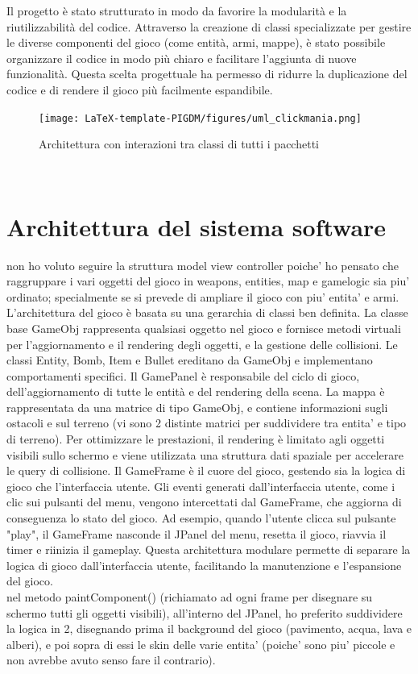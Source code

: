 \documentclass[12pt,a4paper]{report}
\begin{document}
Il progetto è stato strutturato in modo da favorire la modularità e la riutilizzabilità del codice.
Attraverso la creazione di classi specializzate per gestire le diverse componenti del gioco (come entità, armi, mappe),
è stato possibile organizzare il codice in modo più chiaro e facilitare l'aggiunta di nuove funzionalità.
Questa scelta progettuale ha permesso di ridurre la duplicazione del codice e di rendere il gioco più facilmente espandibile.
\begin{figure}[h]
    \centering
    \texttt{[image: LaTeX-template-PIGDM/figures/uml\_clickmania.png]}
    \caption{Architettura con interazioni tra classi di tutti i pacchetti}
    \label{fig:enter-label}
\end{figure}
\\

\section{Architettura del sistema software}\label{se:appjgal}


non ho voluto seguire la struttura model view controller poiche' ho pensato che raggruppare i vari oggetti del gioco in weapons,
entities, map e gamelogic sia piu' ordinato; specialmente se si prevede di ampliare il gioco con piu' entita' e armi.
L'architettura del gioco è basata su una gerarchia di classi ben definita. La classe base GameObj rappresenta qualsiasi oggetto nel
gioco e fornisce metodi virtuali per l'aggiornamento e il rendering degli oggetti, e la gestione delle collisioni.
Le classi Entity, Bomb, Item e Bullet ereditano da GameObj e implementano comportamenti specifici. Il GamePanel è responsabile
del ciclo di gioco, dell'aggiornamento di tutte le entità e del rendering della scena. La mappa è rappresentata da una matrice di
tipo GameObj, e contiene informazioni sugli ostacoli e sul terreno (vi sono 2 distinte matrici per suddividere tra entita' e tipo
di terreno). Per ottimizzare le prestazioni, il rendering è limitato agli oggetti visibili sullo schermo e viene utilizzata una
struttura dati spaziale per accelerare le query di collisione.
Il GameFrame è il cuore del gioco, gestendo sia la logica di gioco che l'interfaccia utente. Gli eventi generati dall'interfaccia utente,
come i clic sui pulsanti del menu, vengono intercettati dal GameFrame, che aggiorna di conseguenza lo stato del gioco.
Ad esempio, quando l'utente clicca sul pulsante "play", il GameFrame nasconde il JPanel del menu, resetta il gioco,
riavvia il timer e riinizia il gameplay. Questa architettura modulare permette di separare la logica di gioco dall'interfaccia utente,
facilitando la manutenzione e l'espansione del gioco.\\
nel metodo paintComponent() (richiamato ad ogni frame per disegnare su schermo tutti gli oggetti visibili), all'interno del JPanel,
ho preferito suddividere la logica in 2, disegnando prima il background del gioco (pavimento, acqua, lava e alberi),
e poi sopra di essi le skin delle varie entita' (poiche' sono piu' piccole e non avrebbe avuto senso fare il contrario).
\\\\
\newpage
\end{document}
